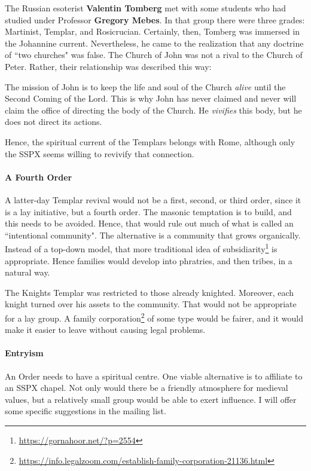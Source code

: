 The Russian esoterist \textbf{Valentin Tomberg} met with some students who had studied under Professor \textbf{Gregory Mebes}. In that group there were three grades: Martinist, Templar, and Rosicrucian. Certainly, then, Tomberg was immersed in the Johannine current. Nevertheless, he came to the realization that any doctrine of ``two churches" was false. The Church of John was not a rival to the Church of Peter. Rather, their relationship was described this way:

\begin{quotex}
The mission of John is to keep the life and soul of the Church \emph{alive} until the Second Coming of the Lord. This is why John has never claimed and never will claim the office of directing the body of the Church. He \emph{vivifies} this body, but he does not direct its actions. 

\end{quotex}
Hence, the spiritual current of the Templars belongs with Rome, although only the SSPX seems willing to revivify that connection.

\paragraph{A Fourth Order}
A latter-day Templar revival would not be a first, second, or third order, since it is a lay initiative, but a fourth order. The masonic temptation is to build, and this needs to be avoided. Hence, that would rule out much of what is called an ``intentional community". The alternative is a community that grows organically. Instead of a top-down model, that more traditional idea of subsidiarity\footnote{\url{https://gornahoor.net/?p=2554}} is appropriate. Hence families would develop into phratries, and then tribes, in a natural way.

The Knights Templar was restricted to those already knighted. Moreover, each knight turned over his assets to the community. That would not be appropriate for a lay group. A family corporation\footnote{\url{https://info.legalzoom.com/establish-family-corporation-21136.html}} of some type would be fairer, and it would make it easier to leave without causing legal problems.

\paragraph{Entryism}
An Order needs to have a spiritual centre. One viable alternative is to affiliate to an SSPX chapel. Not only would there be a friendly atmosphere for medieval values, but a relatively small group would be able to exert influence. I will offer some specific suggestions in the mailing list.

